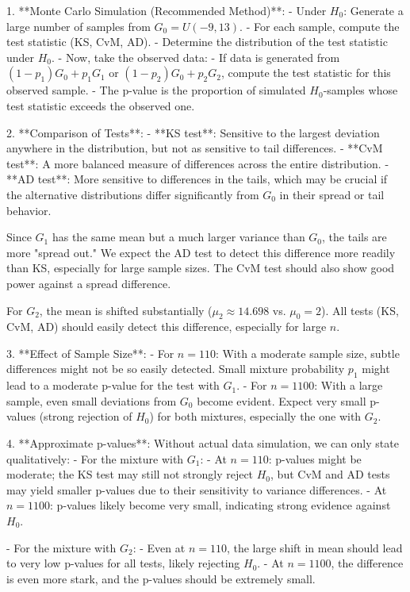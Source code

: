 \documentclass{article}
\begin{document}
1. **Monte Carlo Simulation (Recommended Method)**:
   - Under \(H_0\): Generate a large number of samples from \(G_0 = U(-9,13)\).
   - For each sample, compute the test statistic (KS, CvM, AD).
   - Determine the distribution of the test statistic under \(H_0\).
   - Now, take the observed data:
     - If data is generated from \((1-p_1)G_0 + p_1 G_1\) or \((1-p_2)G_0 + p_2 G_2\), compute the test statistic for this observed sample.
   - The p-value is the proportion of simulated \(H_0\)-samples whose test statistic exceeds the observed one.

2. **Comparison of Tests**:
   - **KS test**: Sensitive to the largest deviation anywhere in the distribution, but not as sensitive to tail differences.
   - **CvM test**: A more balanced measure of differences across the entire distribution.
   - **AD test**: More sensitive to differences in the tails, which may be crucial if the alternative distributions differ significantly from \(G_0\) in their spread or tail behavior.
   
   Since \(G_1\) has the same mean but a much larger variance than \(G_0\), the tails are more "spread out." We expect the AD test to detect this difference more readily than KS, especially for large sample sizes. The CvM test should also show good power against a spread difference.  
   
   For \(G_2\), the mean is shifted substantially (\(\mu_2 \approx 14.698\) vs. \(\mu_0 = 2\)). All tests (KS, CvM, AD) should easily detect this difference, especially for large \(n\).

3. **Effect of Sample Size**:
   - For \(n=110\): With a moderate sample size, subtle differences might not be so easily detected. Small mixture probability \(p_1\) might lead to a moderate p-value for the test with \(G_1\).
   - For \(n=1100\): With a large sample, even small deviations from \(G_0\) become evident. Expect very small p-values (strong rejection of \(H_0\)) for both mixtures, especially the one with \(G_2\).

4. **Approximate p-values**:
   Without actual data simulation, we can only state qualitatively:
   - For the mixture with \(G_1\):
     - At \(n=110\): p-values might be moderate; the KS test may still not strongly reject \(H_0\), but CvM and AD tests may yield smaller p-values due to their sensitivity to variance differences.
     - At \(n=1100\): p-values likely become very small, indicating strong evidence against \(H_0\).

   - For the mixture with \(G_2\):
     - Even at \(n=110\), the large shift in mean should lead to very low p-values for all tests, likely rejecting \(H_0\).
     - At \(n=1100\), the difference is even more stark, and the p-values should be extremely small.
\end{document}
